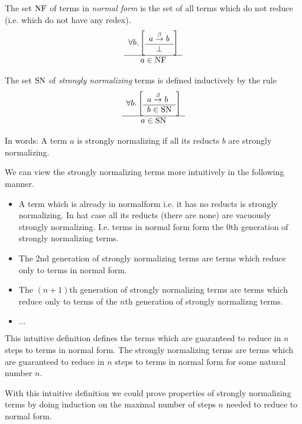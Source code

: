 \begin{definition}
    The set $\text{NF}$ of terms in \emph{normal form} is the set of all terms which
    do not reduce (i.e. which do not have any redex).
    $$
    \begin{array}{c} 
        \forall b. \left[ \begin{array}{c} a \stackrel{\beta}{\to} b \\ \hline \perp\end{array} \right]
     \\ \hline 
        a \in \text{NF}
    \end{array}
    $$
\end{definition}



\begin{definition}
    The set $\text{SN}$ of \emph{strongly normalizing} terms is defined inductively
    by the rule
    $$
        \begin{array}{c} 
            \forall b. \left[ \begin{array}{l} a \stackrel{\beta}{\to} b \\ \hline b \in \text{SN}\end{array} \right]
         \\ \hline 
            a \in \text{SN}
        \end{array}
    $$
\end{definition}

In words: A term $a$ is strongly normalizing if all its reducts $b$ are strongly
normalizing.

We can view the strongly normalizing terms more intuitively in the following
manner.

\begin{itemize}

    \item A term which is already in normalform i.e. it has no reducts is
        strongly normalizing. In hat case all its reducts (there are none) are
        vacuously strongly normalizing. I.e. terms in normal form form the
        $0$th generation of strongly normalizing terms.

    \item The 2nd generation of strongly normalizing terms are terms which
        reduce only to terms in normal form.

    \item The $(n+1)$th generation of strongly normalizing terms are terms which
        reduce only to terms of the $n$th generation of strongly normalizng
        terms.

    \item $\ldots$

\end{itemize}

This intuitive definition defines the terms which are guaranteed to reduce in
$n$ steps to terms in normal form. The strongly normalizing terms are terms
which are guaranteed to reduce in $n$ steps to terms in normal form for some
natural number $n$.

With this intuitive definition we could prove properties of strongly normalizing
terms by doing induction on the maximal number of steps $n$ needed to reduce to
normal form.


